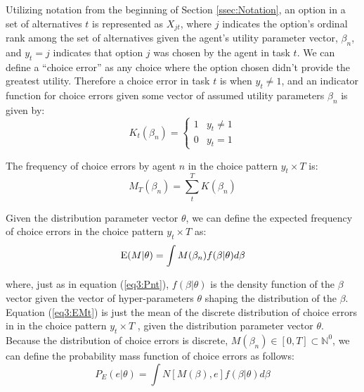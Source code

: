 \documentclass[../main.tex]{subfiles}
\begin{document}
Utilizing notation from the beginning of Section \ref{ssec:Notation}, an option in a set of alternatives $t$ is represented as $X_{jt}$, where $j$ indicates the option's ordinal rank among the set of alternatives given the agent's utility parameter vector, $\beta_n$, and $y_t = j$ indicates that option $j$ was chosen by the agent in task $t$.
We can define a \enquote{choice error} as any choice where the option chosen didn't provide the greatest utility.
Therefore a choice error in task $t$ is when $y_t \neq 1$, and an indicator function for choice errors given some vector of assumed utility parameters $\beta_n$ is given by:
\begin{equation}
	\label{eq3:Itb}
	K_{t}(\beta_n) = 
	\begin{cases}
		 1 & y_t \neq 1\\
		 0 & y_t = 1
	\end{cases}
\end{equation}

\noindent The frequency of choice errors by agent $n$ in the choice pattern $y_t \times T$ is:
\begin{equation}
	\label{eq3:MTBn}
	M_T(\beta_n) = \sum_t^T K(\beta_n)
\end{equation}

Given the distribution parameter vector $\theta$, we can define the expected frequency of choice errors in the choice pattern $y_t \times T$ as:
\begin{equation}
	\label{eq3:EMt}
	\operatorname{E}(M | \theta) = \int M(\beta_n) f(\beta | \theta) d\beta
\end{equation}

\noindent where, just as in equation (\ref{eq3:Pnt}), $f(\beta|\theta)$ is the density function of the $\beta$ vector given the vector of hyper-parameters $\theta$ shaping the distribution of the $\beta$.
Equation (\ref{eq3:EMt}) is just the mean of the discrete distribution of choice errors in in the choice pattern $y_t \times T$ , given the distribution parameter vector $\theta$.
Because the distribution of choice errors is discrete, $M(\beta_n) \in [0,T] \subset \mathbb{N}^0$, we can define the probability mass function of choice errors as follows{\footnotemark}:
\begin{equation}
	\label{eq3:PE}
	P_E(e | \theta) = \int N[M(\beta),e] f(\beta|\theta) d \beta
\end{equation}

\addtocounter{footnote}{-1}
\end{document}
